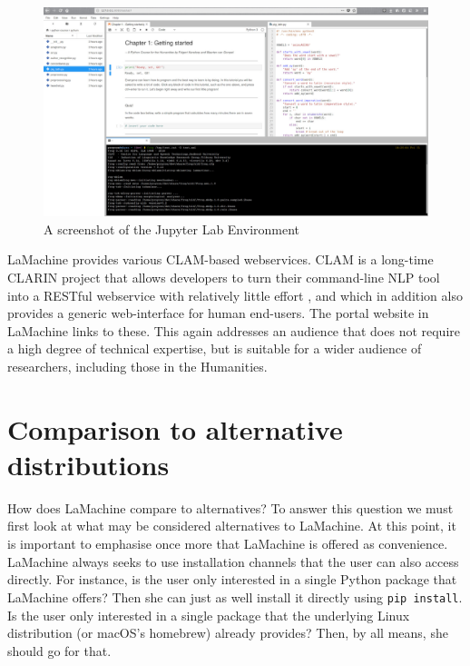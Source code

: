 \documentclass[a4paper,11pt]{article}
\begin{document}
\begin{figure}[htb] \begin{center}
\includegraphics[width=135.0mm]{screenshot_lab.jpg}
\end{center}
\caption{\footnotesize{A screenshot of the Jupyter Lab Environment}}
\label{fig:lab}
\end{figure}

LaMachine provides various CLAM-based webservices. CLAM is a long-time CLARIN project that allows developers to turn
their command-line NLP tool into a RESTful webservice with relatively little effort \cite{CLAMPAPER}, and which in
addition also provides a generic web-interface for human end-users. The portal website in LaMachine links to these. This
again addresses an audience that does not require a high degree of technical expertise, but is suitable for a wider
audience of researchers, including those in the Humanities.

\section{Comparison to alternative distributions}
\label{sec:comparisons}

How does LaMachine compare to alternatives? To answer this question we must first look at what may be considered
alternatives to LaMachine. At this point, it is important to emphasise once more that LaMachine is offered as convenience.
LaMachine always seeks to use installation channels that the user can also access directly. For instance, is the user
only interested in a single Python package that LaMachine offers? Then she can just as well install it directly using
\texttt{pip install}. Is the user only interested in a single package that  the underlying Linux distribution (or
macOS's homebrew)
already provides? Then, by all means, she should go for that.
\end{document}
